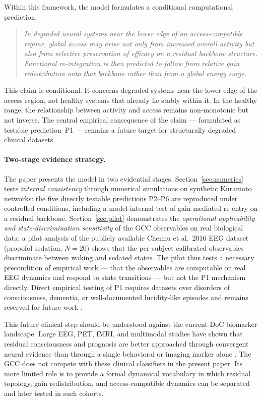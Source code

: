 ﻿\documentclass[11pt,a4paper]{article}
\theoremstyle{plain}
\theoremstyle{definition}
\theoremstyle{remark}
\begin{document}
Within this framework, the model formulates a conditional computational prediction:

\begin{quote}
\itshape
In degraded neural systems near the lower edge of an access-compatible regime, global access may arise not only from increased overall activity but also from selective preservation of efficacy on a residual backbone structure. Functional re-integration is then predicted to follow from relative gain redistribution onto that backbone rather than from a global energy surge.
\end{quote}

This claim is conditional. It concerns degraded systems near the lower edge of the access region, not healthy systems that already lie stably within it. In the healthy range, the relationship between activity and access remains non-monotonic but not inverse. The central empirical consequence of the claim --- formulated as testable prediction~P1 --- remains a future target for structurally degraded clinical datasets.

\paragraph{Two-stage evidence strategy.}
The paper presents the model in two evidential stages. Section~\ref{sec:numerics} tests \emph{internal consistency} through numerical simulations on synthetic Kuramoto networks: the five directly testable predictions P2--P6 are reproduced under controlled conditions, including a model-internal test of gain-mediated re-entry on a residual backbone. Section~\ref{sec:pilot} demonstrates the \emph{operational applicability and state-discrimination sensitivity} of the GCC observables on real biological data: a pilot analysis of the publicly available Chennu et al.\ 2016 EEG dataset (propofol sedation, $N = 20$) shows that the per-subject calibrated observables discriminate between waking and sedated states. The pilot thus tests a necessary precondition of empirical work --- that the observables are computable on real EEG dynamics and respond to state transitions --- but not the P1 mechanism directly. Direct empirical testing of P1 requires datasets over disorders of consciousness, dementia, or well-documented lucidity-like episodes and remains reserved for future work \citep{giacino2018,mashour2019}.

This future clinical step should be understood against the current DoC biomarker landscape. Large EEG, PET, fMRI, and multimodal studies have shown that residual consciousness and prognosis are better approached through convergent neural evidence than through a single behavioral or imaging marker alone \citep{stender2014,sitt2014,engemann2018,hermann2021,edlow2021,manasova2026}. The GCC does not compete with these clinical classifiers in the present paper. Its more limited role is to provide a formal dynamical vocabulary in which residual topology, gain redistribution, and access-compatible dynamics can be separated and later tested in such cohorts.
\end{document}
